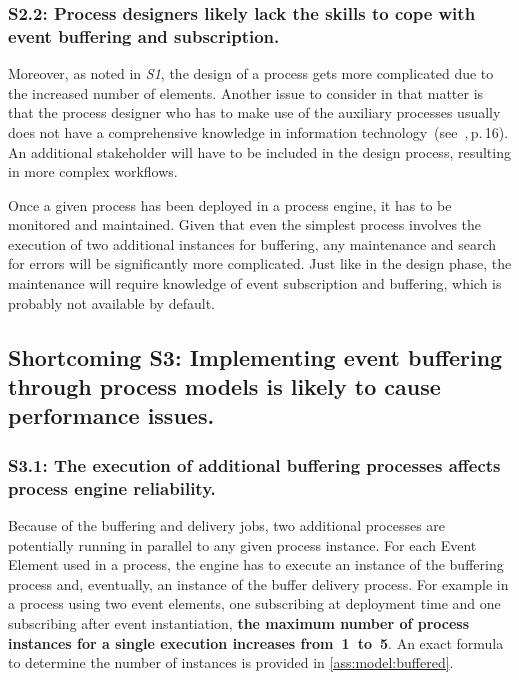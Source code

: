 \subsubsection*{S2.2: Process designers likely lack the skills to cope with event buffering and subscription.}
Moreover, as noted in \textit{S1}, the design of a process gets more complicated due to the increased number of elements.
Another issue to consider in that matter is that the process designer who has to make use of the auxiliary processes usually does not have a comprehensive knowledge in information technology~(see~\cite{bpm-book},\,p.\,16). An additional stakeholder will have to be included in the design process, resulting in more complex workflows.

Once a given process has been deployed in a process engine, it has to be monitored and maintained.
Given that even the simplest process involves the execution of two additional instances for buffering, any maintenance and search for errors will be significantly more complicated.
Just like in the design phase, the maintenance will require knowledge of event subscription and buffering, which is probably not available by default.


\subsection*{Shortcoming S3: Implementing event buffering through process models is likely to cause performance issues.}

\subsubsection*{S3.1: The execution of additional buffering processes affects process engine reliability.}

Because of the buffering and delivery jobs, two additional processes are potentially running in parallel to any given process instance. For each Event Element used in a process, the engine has to execute an instance of the buffering process and, eventually, an instance of the buffer delivery process.
For example in a process using two event elements, one subscribing at deployment time and one subscribing after event instantiation, \textbf{the maximum number of process instances for a single execution increases from~1~to~5}. An exact formula to determine the number of instances is provided in \ref{ass:model:buffered}.


